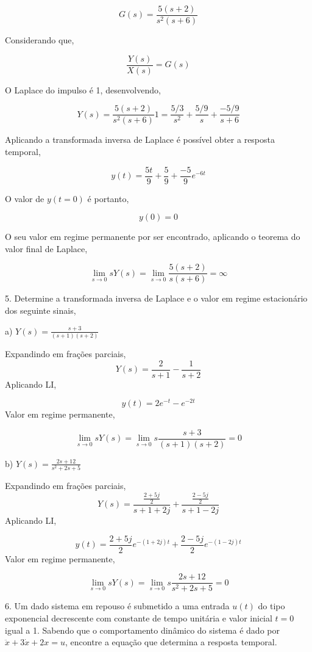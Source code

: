 \documentclass[paper=a4, fontsize=11pt]{article}
\begin{document}
$$
G(s) = \frac{5(s+2)}{s^2(s+6)}
$$

Considerando que,

$$
\frac{Y(s)}{X(s)} = G(s)
$$

O Laplace do impulso é 1, desenvolvendo,

$$
Y(s) =  \frac{5(s+2)}{s^2(s+6)} 1 = \frac{5/3}{s^2} + \frac{5/9}{s} + \frac{-5/9}{s+6}
$$

Aplicando a transformada inversa de Laplace é possível obter a resposta temporal,

$$
y(t) = \frac{5 t}{9} + \frac{5}{9} + \frac{-5}{9} e^{-6 t}
$$

O valor de $y(t=0)$ é portanto,

$$
y(0) = 0
$$

O seu valor em regime permanente por ser encontrado, aplicando o teorema do valor final de Laplace,

$$
\lim_{s \to 0 }{s Y(s)} = \lim_{s \to 0}{\frac{5(s+2)}{s(s+6)}} = \infty
$$

\newpage

5. Determine a transformada inversa de Laplace e o valor em regime estacionário dos seguinte
sinais,

a) $Y(s) = \frac{s+3}{(s+1)(s+2)}$

Expandindo em frações parciais,
$$
Y(s) = \frac{2}{s+1} - \frac{1}{s+2}
$$
Aplicando LI,

$$
y(t) = 2 e^{-t} - e^{-2 t}
$$
Valor em regime permanente,

$$
\lim_{s \to 0 }{s Y(s)} = \lim_{s \to 0}{s \frac{s+3}{(s+1)(s+2)}} = 0 
$$

b) $Y(s) = \frac{2 s + 12}{s^2+2 s+5}$

Expandindo em frações parciais,
$$
Y(s) = \frac{ \frac{2+5j}{2} }{s+1+2j} + \frac{ \frac{2-5j}{2} }{s+1-2j}
$$
Aplicando LI,

$$
y(t) = \frac{2+5j}{2} e^{-(1+2j)t} +  \frac{2-5j}{2} e^{-(1-2j)t}
$$
Valor em regime permanente,

$$ 
\lim_{s \to 0 }{s Y(s)} = \lim_{s \to 0}{s \frac{2 s + 12}{s^2+2 s+5}} = 0  
$$

\newpage

6. Um dado sistema em repouso é submetido a uma entrada $u(t)$ do tipo exponencial
decrescente com constante de tempo unitária e valor inicial $t=0$ igual a 1. Sabendo
que o comportamento dinâmico do sistema é dado por $\ddot{x} + 3 \dot{x} + 2 x = u$,
encontre a equação que determina a resposta temporal.
\end{document}
